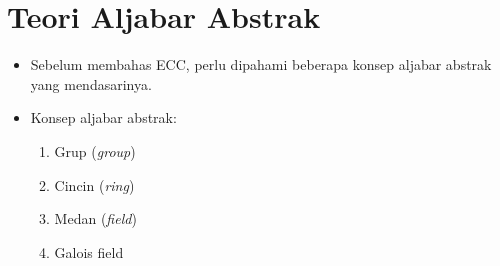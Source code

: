 \documentclass{article}
\begin{document}

\section*{Teori Aljabar Abstrak}

\begin{itemize}
    \item Sebelum membahas ECC, perlu dipahami beberapa konsep aljabar abstrak yang mendasarinya.
\end{itemize}

\begin{itemize}
    \item Konsep aljabar abstrak:
    \begin{enumerate}
        \item Grup (\textit{group})
        \item Cincin (\textit{ring})
        \item Medan (\textit{field})
        \item Galois field
    \end{enumerate}
\end{itemize}
\end{document}
